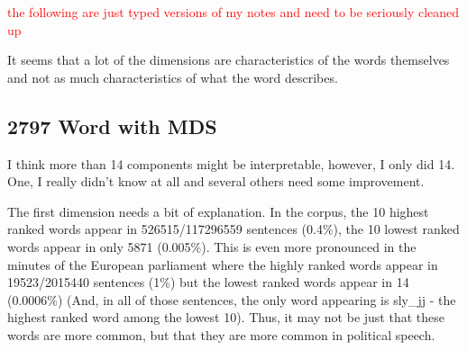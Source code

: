 \documentclass[10pt,letterpaper]{book}
\newcommand{\todo}[1]{\textcolor{red}{#1}}
\begin{document}
\todo{the following are just typed versions of my notes and need to be 
seriously cleaned up}

It seems that a lot of the dimensions are characteristics of the words 
themselves and not as much characteristics of what the word describes.

\subsection{2797 Word with MDS}

I think more than 14 components might be interpretable, however, I only did 14. 
One, I really didn't know at all and several others need some improvement. 

The first dimension needs a bit of explanation. In the corpus, the 10 highest 
ranked words appear in 526515/117296559 sentences (0.4\%), the 10 lowest 
ranked words appear in only 5871 (0.005\%). This is even more pronounced in the 
minutes of the European parliament where the highly ranked words appear in 
19523/2015440 sentences (1\%) but the lowest ranked words appear in 14 
(0.0006\%) (And, in all of those sentences, the only word appearing is 
sly_jj - the highest ranked word among the lowest 10). Thus, it may not be just 
that these words are more common, but that they are more common in political 
speech.
\end{document}
